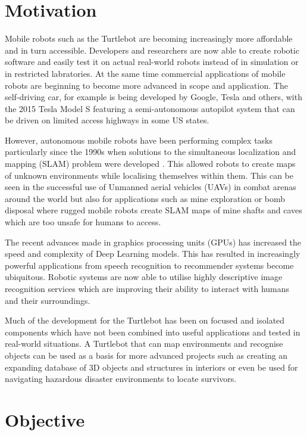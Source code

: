 \documentclass{mproj}
\begin{document}
\section{Motivation}

Mobile robots such as the Turtlebot are becoming increasingly more affordable and in turn accessible. Developers and researchers are now able to create robotic software and easily test it on actual real-world robots instead of in simulation or in restricted labratories. At the same time commercial applications of mobile robots are beginning to become more advanced in scope and application. The self-driving car, for example is being developed by Google, Tesla and others, with the 2015 Tesla Model S featuring a semi-autonomous autopilot system that can be driven on limited access highways in some US states.\cite{tesla}

However, autonomous mobile robots have been performing complex tasks particularly since the 1990s when solutions to the simultaneous localization and mapping (SLAM) problem were developed \cite{Hugh2006}. This allowed robots to create maps of unknown environments while localising themselves within them. This can be seen in the successful use of Unmanned aerial vehicles (UAVs) in combat arenas around the world but also for applications such as mine exploration or bomb disposal where rugged mobile robots create SLAM maps of mine shafts and caves which are too unsafe for humans to access. \cite{mining}

The recent advances made in graphics processing units (GPUs) has increased the speed and complexity of Deep Learning models. This has resulted in increasingly powerful applications from speech recognition to recommender systems become ubiquitous. Robotic systems are now able to utilise highly descriptive image recognition services which are improving their ability to interact with humans and their surroundings.  

Much of the development for the Turtlebot has been on focused and isolated components which have not been combined into useful applications and tested in real-world situations. A Turtlebot that can map environments and recognise objects can be used as a basis for more advanced projects such as creating an expanding database of 3D objects and structures in interiors or even be used for navigating hazardous disaster environments to locate survivors.

\section{Objective}
\end{document}
